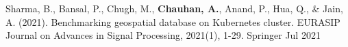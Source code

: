 



\begin{publications}


  \publication
    {} %
    {Sharma, B., Bansal, P., Chugh, M., \textbf{Chauhan, A.}, Anand, P., Hua, Q., \& Jain, A. (2021). Benchmarking geospatial database on Kubernetes cluster. EURASIP Journal on Advances in Signal Processing, 2021(1), 1-29.} %
    {Springer} %
    {Jul 2021} %

\end{publications}
